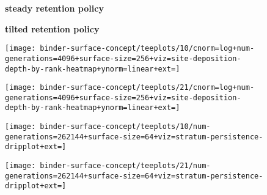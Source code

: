 \begin{figure*}[h!]
  \centering
\begin{subfigure}[b]{0.43\linewidth}
\centering
\textbf{steady retention policy}
\end{subfigure}
\begin{subfigure}[b]{0.43\linewidth}
\centering
\textbf{tilted retention policy}
\end{subfigure}

\vspace{-1.5ex}

  \begin{subfigure}[b]{0.5\linewidth}
    \centering
  \texttt{[image: binder-surface-concept/teeplots/10/cnorm=log+num-generations=4096+surface-size=256+viz=site-deposition-depth-by-rank-heatmap+ynorm=linear+ext=]}


  \end{subfigure}%
  \begin{subfigure}[b]{0.5\linewidth}
    \centering
  \texttt{[image: binder-surface-concept/teeplots/21/cnorm=log+num-generations=4096+surface-size=256+viz=site-deposition-depth-by-rank-heatmap+ynorm=linear+ext=]}


  \end{subfigure}

\vspace{-1ex}

\begin{subfigure}[b]{0.5\linewidth}
  \flushleft
\texttt{[image: binder-surface-concept/teeplots/10/num-generations=262144+surface-size=64+viz=stratum-persistence-dripplot+ext=]}


  \label{fig:steady-retention-plot}
\end{subfigure}%
\begin{subfigure}[b]{0.5\linewidth}
  \centering
\texttt{[image: binder-surface-concept/teeplots/21/num-generations=262144+surface-size=64+viz=stratum-persistence-dripplot+ext=]}


\end{subfigure}
\end{figure*}
